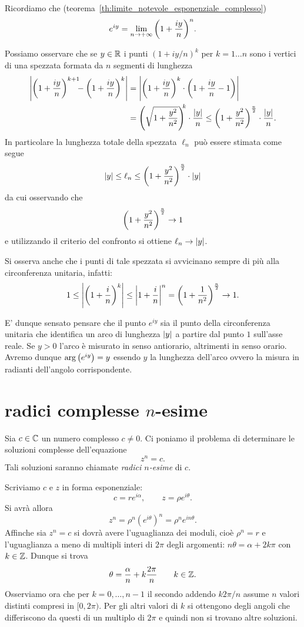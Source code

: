 \begin{remark}
Ricordiamo che (teorema~\ref{th:limite_notevole_esponenziale_complesso})
\[
  e^{iy} = \lim_{n\to +\infty} {\left( 1+\frac{iy}{n} \right)}^n.
\]

Possiamo osservare che se $y\in {\mathbb R}$
i punti $(1+iy/n)^k$ per $k=1\dots n$
sono i vertici di una spezzata
formata da $n$ segmenti
di lunghezza
\begin{align*}
 {\left|{\left( 1+\frac{iy}n \right)}^{k+1}\!\!\! - {\left( 1+ \frac{iy}n \right)}^k\right|}
 &= {\left|{\left( 1+\frac{iy}n \right)}^k\cdot {\left( 1+\frac{iy}n -1 \right)}\right|}\\
 &= {\left( \sqrt{1+\frac{y^2}{n^2}} \right)}^{\!\!k} \cdot \frac{{\left|y\right|}}{n}
 \le {\left( 1+\frac{y^2}{n^2} \right)}^{\frac n 2}\cdot \frac{{\left|y\right|}}{n}.
\end{align*}
In particolare la lunghezza totale della spezzata $\ell_n$ può essere stimata
come segue
\[
  {\left|y\right|}
  \le \ell_n
  \le {\left( 1+\frac{y^2}{n^2} \right)}^{\frac n 2} \cdot {\left|y\right|}
\]
da cui osservando che
\[
 {\left( 1+\frac{y^2}{n^2} \right)}^{\frac n 2} \to 1
\]
e utilizzando il criterio del confronto
si ottiene $\ell_n \to {\left|y\right|}$.

Si osserva anche che i punti di tale spezzata si avvicinano
sempre di più alla circonferenza unitaria, infatti:
\[
  1
  \le {\left|{\left( 1 + \frac i n \right)}^k\right|}
  \le {\left|1+\frac i n\right|}^n
  = {\left( 1 + \frac 1 {n^2} \right)}^{\frac n 2}
  \to 1.
\]

E' dunque sensato pensare che il punto $e^{iy}$ sia il punto
della circonferenza unitaria che identifica un arco di lunghezza ${\left|y\right|}$
a partire dal punto $1$ sull'asse reale.
Se $y>0$ l'arco è misurato in senso antiorario, altrimenti in senso orario.
Avremo dunque $\arg{\left( e^{iy} \right)} = y$ essendo $y$ la lunghezza dell'arco
ovvero la misura in radianti dell'angolo corrispondente.
\end{remark}

\section{radici complesse $n$-esime}

Sia $c\in {\mathbb C}$ un numero
complesso $c\neq 0$.
Ci poniamo il problema di determinare le soluzioni complesse
dell'equazione
\[
  z^n = c.
\]
Tali soluzioni saranno chiamate \emph{radici $n$-esime}%
%
 di $c$.

Scriviamo $c$ e $z$ in forma esponenziale:
\[
  c = r e^{i\alpha}, \qquad
  z = \rho e^{i\theta}.
\]
Si avrà allora
\[
  z^n = \rho^n (e^{i\theta})^n = \rho^n e^{i n \theta}.
\]
Affinche sia $z^n = c$ si dovrà avere l'uguaglianza dei moduli, cioè $\rho^n = r$ e l'uguaglianza a meno di multipli interi di $2\pi$ degli argomenti:
$n \theta = \alpha + 2 k \pi$ con $k\in {\mathbb Z}$.
Dunque si trova
\[
  \theta = \frac{\alpha}{n} + k\frac{2\pi}{n}
\qquad k \in {\mathbb Z}.
\]
Osserviamo ora che per $k=0,\dots, n-1$ il secondo addendo
$k 2\pi /n$ assume $n$ valori distinti compresi in $[0,2\pi)$.
Per gli altri valori di $k$ si ottengono degli angoli che differiscono
da questi di un multiplo di $2\pi$ e quindi non si trovano
altre soluzioni.

